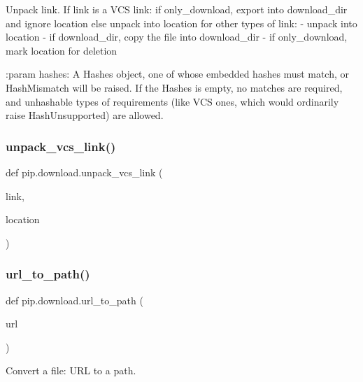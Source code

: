 \begin{DoxyVerb}Unpack link.
   If link is a VCS link:
     if only_download, export into download_dir and ignore location
      else unpack into location
   for other types of link:
     - unpack into location
     - if download_dir, copy the file into download_dir
     - if only_download, mark location for deletion

:param hashes: A Hashes object, one of whose embedded hashes must match,
    or HashMismatch will be raised. If the Hashes is empty, no matches are
    required, and unhashable types of requirements (like VCS ones, which
    would ordinarily raise HashUnsupported) are allowed.
\end{DoxyVerb}
 \mbox{\label{namespacepip_1_1download_a9059fb2bd4b17f476f692a556eeeace9}} 
\subsubsection{\texorpdfstring{unpack\+\_\+vcs\+\_\+link()}{unpack\_vcs\_link()}}
{\footnotesize\ttfamily def pip.\+download.\+unpack\+\_\+vcs\+\_\+link (\begin{DoxyParamCaption}\item[{}]{link,  }\item[{}]{location }\end{DoxyParamCaption})}

\mbox{\label{namespacepip_1_1download_ad818b3bf9d9360957de154b2d3a35629}} 
\subsubsection{\texorpdfstring{url\+\_\+to\+\_\+path()}{url\_to\_path()}}
{\footnotesize\ttfamily def pip.\+download.\+url\+\_\+to\+\_\+path (\begin{DoxyParamCaption}\item[{}]{url }\end{DoxyParamCaption})}

\begin{DoxyVerb}Convert a file: URL to a path.
\end{DoxyVerb}
 \mbox{\label{namespacepip_1_1download_a1adf8d9a00b88ff01bb5de6168965549}} 
